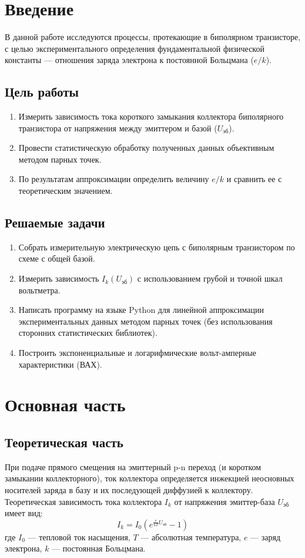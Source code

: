 \section{Введение}
В данной работе исследуются процессы, протекающие в биполярном транзисторе, с целью экспериментального определения фундаментальной физической константы — отношения заряда электрона к постоянной Больцмана ($e/k$).

\subsection{Цель работы}
\begin{enumerate}
    \item Измерить зависимость тока короткого замыкания коллектора биполярного транзистора от напряжения между эмиттером и базой ($U_{эб}$).
    \item Провести статистическую обработку полученных данных объективным методом парных точек.
    \item По результатам аппроксимации определить величину $e/k$ и сравнить ее с теоретическим значением.
\end{enumerate}

\subsection{Решаемые задачи}
\begin{enumerate}
    \item Собрать измерительную электрическую цепь с биполярным транзистором по схеме с общей базой.
    \item Измерить зависимость $I_k(U_{эб})$ с использованием грубой и точной шкал вольтметра.
    \item Написать программу на языке Python для линейной аппроксимации экспериментальных данных методом парных точек (без использования сторонних статистических библиотек).
    \item Построить экспоненциальные и логарифмические вольт-амперные характеристики (ВАХ).
\end{enumerate}

\section{Основная часть}

\subsection{Теоретическая часть}
При подаче прямого смещения на эмиттерный p-n переход (и коротком замыкании коллекторного), ток коллектора определяется инжекцией неосновных носителей заряда в базу и их последующей диффузией к коллектору. Теоретическая зависимость тока коллектора $I_k$ от напряжения эмиттер-база $U_{эб}$ имеет вид:
\begin{equation}
    I_k = I_0 \left( e^{\frac{e}{kT} U_{эб}} - 1 \right)
\end{equation}
где $I_0$ — тепловой ток насыщения, $T$ — абсолютная температура, $e$ — заряд электрона, $k$ — постоянная Больцмана.

